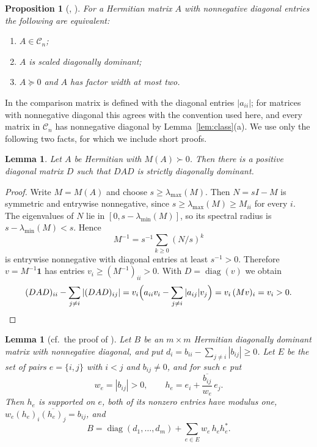 \documentclass[11pt]{amsart}
\newtheorem{lemma}[theorem]{Lemma}
\newtheorem{proposition}[theorem]{Proposition}
\theoremstyle{remark}
\numberwithin{equation}{section}
\newcommand{\diag}{\operatorname{diag}}
\newcommand{\cC}{\mathcal{C}}
\newcommand{\conj}[1]{\overline{#1}}
\begin{document}
\begin{proposition}[{\cite[Theorem~3.9]{SN}, \cite[Theorem~9]{BCPT}}]\label{prop:known}
For a Hermitian matrix $A$ with nonnegative diagonal entries the following are equivalent:
\begin{enumerate}
\item[(i)] $A\in\cC_n$;
\item[(ii)] $A$ is scaled diagonally dominant;
\item[(iii)] $A\succeq0$ and $A$ has factor width at most two.
\end{enumerate}
\end{proposition}

In \cite{SN} the comparison matrix is defined with the diagonal entries $|a_{ii}|$; for matrices with nonnegative diagonal this agrees with the convention used here, and every matrix in $\cC_n$ has nonnegative diagonal by Lemma~\ref{lem:class}(a). We use only the following two facts, for which we include short proofs.

\begin{lemma}\label{lem:scaling}
Let $A$ be Hermitian with $M(A)\succ0$. Then there is a positive diagonal matrix $D$ such that $DAD$ is strictly diagonally dominant.
\end{lemma}

\begin{proof}
Write $M=M(A)$ and choose $s\ge\lambda_{\max}(M)$. Then $N=sI-M$ is symmetric and entrywise nonnegative, since $s\ge\lambda_{\max}(M)\ge M_{ii}$ for every $i$. The eigenvalues of $N$ lie in $[0,s-\lambda_{\min}(M)]$, so its spectral radius is $s-\lambda_{\min}(M)<s$. Hence
\[
M^{-1}=s^{-1}\sum_{k\ge0}(N/s)^k
\]
is entrywise nonnegative with diagonal entries at least $s^{-1}>0$. Therefore $v=M^{-1}\mathbf{1}$ has entries $v_i\ge(M^{-1})_{ii}>0$. With $D=\diag(v)$ we obtain
\[
(DAD)_{ii}-\sum_{j\ne i}|(DAD)_{ij}|=v_i\Bigl(a_{ii}v_i-\sum_{j\ne i}|a_{ij}|v_j\Bigr)=v_i\,(Mv)_i=v_i>0.\qedhere
\]
\end{proof}

\begin{lemma}[{cf.\ the proof of \cite[Lemma~3.7]{SN}}]\label{lem:gram}
Let $B$ be an $m\times m$ Hermitian diagonally dominant matrix with nonnegative diagonal, and put $d_i=b_{ii}-\sum_{j\ne i}|b_{ij}|\ge0$. Let $E$ be the set of pairs $e=\{i,j\}$ with $i<j$ and $b_{ij}\ne0$, and for such $e$ put
\[
w_e=|b_{ij}|>0,\qquad h_e=e_i+\frac{\conj{b_{ij}}}{w_e}\,e_j.
\]
Then $h_e$ is supported on $e$, both of its nonzero entries have modulus one, $w_e(h_e)_i\conj{(h_e)_j}=b_{ij}$, and
\begin{equation}\label{eq:gram}
B=\diag(d_1,\dots,d_m)+\sum_{e\in E}w_e\,h_eh_e^*.
\end{equation}
\end{lemma}
\end{document}
